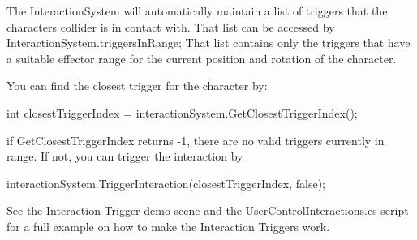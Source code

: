 The Interaction\+System will automatically maintain a list of triggers that the character\textquotesingle{}s collider is in contact with. That list can be accessed by Interaction\+System.\+triggers\+In\+Range; That list contains only the triggers that have a suitable effector range for the current position and rotation of the character.

You can find the closest trigger for the character by\+: 
\begin{DoxyCode}
\textcolor{keywordtype}{int} closestTriggerIndex = interactionSystem.GetClosestTriggerIndex();
\end{DoxyCode}


if Get\+Closest\+Trigger\+Index returns -\/1, there are no valid triggers currently in range. If not, you can trigger the interaction by


\begin{DoxyCode}
interactionSystem.TriggerInteraction(closestTriggerIndex, \textcolor{keyword}{false});
\end{DoxyCode}


See the Interaction Trigger demo scene and the \mbox{\hyperlink{_user_control_interactions_8cs}{User\+Control\+Interactions.\+cs}} script for a full example on how to make the Interaction Triggers work.

